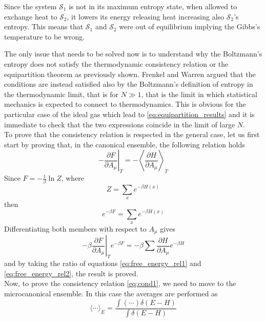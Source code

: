 Since the system $\mathcal{S}_1$ is not in its maximum entropy state, when allowed to exchange heat to $\mathcal{S}_2$, it lowers its energy releasing heat increasing also $\mathcal{S}_2$'s entropy.
This means that $\mathcal{S}_1$ and $\mathcal{S}_2$ were out of equilibrium implying the Gibbs's temperature to be wrong. \par
\vspace{10pt}
The only issue that needs to be solved now is to understand why the Boltzmann's entropy does not satisfy the thermodynamic consistency relation or the equipartition theorem as previously shown. Frenkel and Warren argued that the conditions are instead satisfied also by the Boltzmann's definition of entropy in the thermodynamic limit, that is for $N \gg 1$, that is the limit in which statistical mechanics is expected to connect to thermodynamics.
This is obvious for the particular case of the ideal gas which lead to \ref{eq:equipartition_results} and it is immediate to check that the two expressions coincide in the limit of large $N$. \\
To prove that the consistency relation is respected in the general case, let us first start by proving that, in the canonical ensemble, the following relation holds
\begin{equation}
    -\left.\frac{\partial F}{\partial A_{\mu}}\right|_{T}=-\left\langle\frac{\partial H}{\partial A_{\mu}}\right\rangle_{T}
    \label{eq:entropy_eq_1}
\end{equation}
Since $F = -\frac{1}{\beta} \ln Z$, where
\begin{equation*}
    Z = \sum_x e^{-\beta H(x)}
\end{equation*} 
then 
\begin{equation}
    e^{-\beta F}=\sum_x e^{-\beta H(x)}
    \label{eq:free_energy_rel1}
\end{equation}
Differentiating both members with respect to $A_{\mu}$ gives 
\begin{equation}
    -\left.\beta \frac{\partial F}{\partial A_{\mu}}\right|_{T} e^{-\beta F}=-\beta \sum \frac{\partial H}{\partial A_{\mu}} e^{-\beta H}
    \label{eq:free_energy_rel2}
\end{equation}
and by taking the ratio of equations \ref{eq:free_energy_rel1} and \ref{eq:free_energy_rel2}, the result is proved. \\
Now, to prove the consistency relation \ref{eq:cond1}, we need to move to the microcanonical ensemble. In this case the averages are performed as 
\begin{equation*}
    \langle\cdots\rangle_{E}=\frac{\int (\cdots) \delta(E-H)}{\int \delta(E-H)}
\end{equation*}

